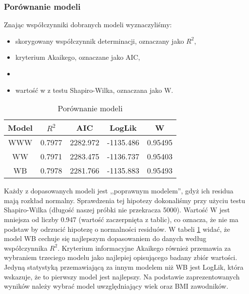 \documentclass[11pt,a4paper]{article}
\begin{document}
\subsubsection{Porównanie modeli}
Znając współczynniki dobranych modeli wyznaczyliśmy:
\begin{itemize}
	\item skorygowany współczynnik determinacji, oznaczany jako $R^2$,
	\item kryterium Akaikego, oznaczane jako AIC,
	\item 
	\item wartość w z testu Shapiro-Wilka, oznaczana jako W.
\end{itemize}

\begin{table}[H]
	\begin{center}
	\begin{tabular}{| c | c | c | c | c |}
		\hline
		Model & $R^2$ & AIC & LogLik & W\\ \hline
		WWW & 0.7977 & 2282.972 & -1135.486 & 0.95495\\ \hline
		WW & 0.7971 & 2283.475 & -1136.737 & 0.95403\\ \hline 
		WB & 0.7978 & 2281.766 & -1135.883 & 0.95493\\ \hline  
	\end{tabular}
	\caption{Porównanie modeli}
	\label{porownanie_modeli_w}
\end{center}
\end{table}
Każdy z dopasowanych modeli jest ,,poprawnym modelem'', gdyż ich residua mają rozkład normalny. Sprawdzenia tej hipotezy dokonaliśmy przy użyciu testu Shapiro-Wilka (długość naszej próbki nie przekracza 5000). Wartość W jest mniejsza od liczby 0.947 (wartość zaczerpnięta z tablic), co oznacza, że nie ma podstaw by odrzucić hipotezę o normalności residuów. W tabeli \ref{porownanie_modeli_w} widać, że model WB cechuje się najlepszym dopasowaniem do danych według współczynnika $R^2$. Kryterium informacyjne Akaikego również przemawia za wybraniem trzeciego modelu jako najlepiej opisującego badany zbiór wartości. Jedyną statystyką przemawiającą za innym modelem niż WB jest LogLik, która wskazuje, że to pierwszy model jest najlepszy. Na podstawie zaprezentowanych wyników należy wybrać model uwzględniający wiek oraz BMI zawodników.
\end{document}

